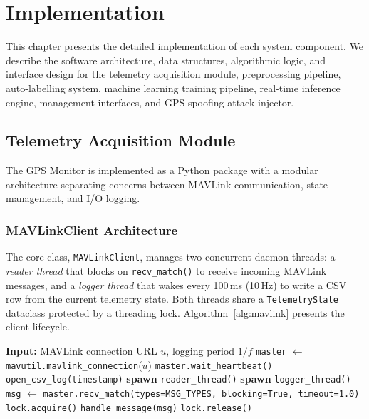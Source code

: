 \chapter{Implementation}

This chapter presents the detailed implementation of each system component. We describe the software architecture, data structures, algorithmic logic, and interface design for the telemetry acquisition module, preprocessing pipeline, auto-labelling system, machine learning training pipeline, real-time inference engine, management interfaces, and GPS spoofing attack injector.

\section{Telemetry Acquisition Module}

The GPS Monitor is implemented as a Python package with a modular architecture separating concerns between MAVLink communication, state management, and I/O logging.

\subsection{MAVLinkClient Architecture}

The core class, \texttt{MAVLinkClient}, manages two concurrent daemon threads: a \textit{reader thread} that blocks on \texttt{recv\_match()} to receive incoming MAVLink messages, and a \textit{logger thread} that wakes every 100\,ms (10\,Hz) to write a CSV row from the current telemetry state. Both threads share a \texttt{TelemetryState} dataclass protected by a threading lock. Algorithm~\ref{alg:mavlink} presents the client lifecycle.

\begin{algorithm}[H]
\caption{MAVLinkClient Lifecycle}
\label{alg:mavlink}
\begin{algorithmic}[1]
\State \textbf{Input:} MAVLink connection URL $u$, logging period $1/f$
\State \texttt{master} $\gets$ \texttt{mavutil.mavlink\_connection}($u$)
\State \texttt{master.wait\_heartbeat()}
\State \texttt{open\_csv\_log(timestamp)}
\State \textbf{spawn} \texttt{reader\_thread()} 
\State \textbf{spawn} \texttt{logger\_thread()} 
    \State \texttt{msg} $\gets$ \texttt{master.recv\_match(types=MSG\_TYPES, blocking=True, timeout=1.0)}
        \State \texttt{lock.acquire()}
        \State \texttt{handle\_message(msg)}
        \State \texttt{lock.release()}
    \EndIf
\EndWhile
\end{algorithmic}
\end{algorithm}

